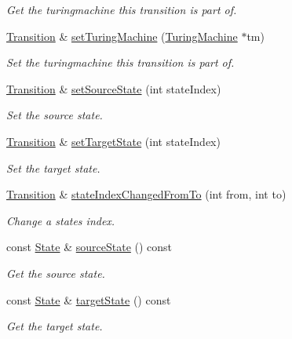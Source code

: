 \begin{DoxyCompactItemize}
\begin{DoxyCompactList}\small\item\em \-Get the turingmachine this transition is part of. \end{DoxyCompactList}\item 
\hyperlink{classtum_1_1_transition}{\-Transition} \& \hyperlink{classtum_1_1_transition_aa89e4028a1ad27826d58b04acae097c2}{set\-Turing\-Machine} (\hyperlink{classtum_1_1_turing_machine}{\-Turing\-Machine} $\ast$tm)
\begin{DoxyCompactList}\small\item\em \-Set the turingmachine this transition is part of. \end{DoxyCompactList}\item 
\hyperlink{classtum_1_1_transition}{\-Transition} \& \hyperlink{classtum_1_1_transition_a7f2608b11b491ce56037acf65f6c9ab9}{set\-Source\-State} (int state\-Index)
\begin{DoxyCompactList}\small\item\em \-Set the source state. \end{DoxyCompactList}\item 
\hyperlink{classtum_1_1_transition}{\-Transition} \& \hyperlink{classtum_1_1_transition_abe41aecbe7d15172e81d6a2f81bdb2f2}{set\-Target\-State} (int state\-Index)
\begin{DoxyCompactList}\small\item\em \-Set the target state. \end{DoxyCompactList}\item 
\hyperlink{classtum_1_1_transition}{\-Transition} \& \hyperlink{classtum_1_1_transition_a460f2c7e27374a21b89efb92494bcb55}{state\-Index\-Changed\-From\-To} (int from, int to)
\begin{DoxyCompactList}\small\item\em \-Change a states index. \end{DoxyCompactList}\item 
const \hyperlink{classtum_1_1_state}{\-State} \& \hyperlink{classtum_1_1_transition_ad94749a902d937b0a8d06e98b5395b4e}{source\-State} () const 
\begin{DoxyCompactList}\small\item\em \-Get the source state. \end{DoxyCompactList}\item 
const \hyperlink{classtum_1_1_state}{\-State} \& \hyperlink{classtum_1_1_transition_a6f964a8db582ca8ebd697dbde08ddb31}{target\-State} () const 
\begin{DoxyCompactList}\small\item\em \-Get the target state. \end{DoxyCompactList}\item 

\end{DoxyCompactItemize}
